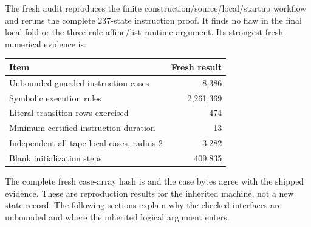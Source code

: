 The fresh audit reproduces the finite construction/source/local/startup
workflow and reruns the complete 237-state instruction proof.  It finds
no flaw in the final local fold or the three-rule affine/list runtime
argument.  Its strongest fresh numerical evidence is:
\begin{center}
\begin{tabular}{@{}lr@{}}
\toprule
Item & Fresh result\\
\midrule
Unbounded guarded instruction cases & 8,386\\
Symbolic execution rules & 2,261,369\\
Literal transition rows exercised & 474\\
Minimum certified instruction duration & 13\\
Independent all-tape local cases, radius 2 & 3,282\\
Blank initialization steps & 409,835\\
\bottomrule
\end{tabular}
\end{center}
The complete fresh case-array hash is
and the case bytes agree with the shipped evidence.  These are
reproduction results for the inherited machine, not a new state record.
The following sections explain why the checked interfaces are unbounded
and where the inherited logical argument enters.
